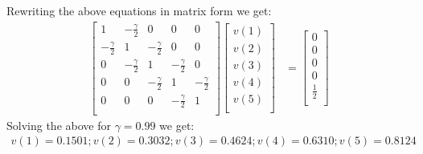 Rewriting the above equations in matrix form we get:
\begin{align*}
    \begin{bmatrix}
        1 & -\frac{\gamma}{2} & 0 & 0 & 0 \\
        -\frac{\gamma}{2} & 1 & -\frac{\gamma}{2} & 0 & 0 \\
        0 & -\frac{\gamma}{2} & 1 & -\frac{\gamma}{2} & 0 \\
        0 & 0 & -\frac{\gamma}{2} & 1 & -\frac{\gamma}{2} \\
        0 & 0 & 0 & -\frac{\gamma}{2} & 1 \\
    \end{bmatrix}
    \begin{bmatrix}
        v(1) \\
        v(2) \\
        v(3) \\
        v(4) \\
        v(5) \\
    \end{bmatrix}
    &=
    \begin{bmatrix}
        0 \\
        0 \\
        0 \\
        0 \\
        \frac{1}{2} \\
    \end{bmatrix}
\end{align*}
Solving the above for $\gamma=0.99$ we get:
\begin{align*}
    v(1) = 0.1501; 
    v(2) = 0.3032; 
    v(3) = 0.4624; 
    v(4) = 0.6310; 
    v(5) = 0.8124
\end{align*}

